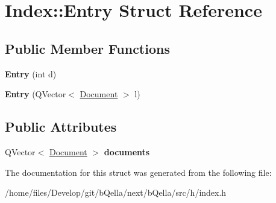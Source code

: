 \hypertarget{structIndex_1_1Entry}{
\section{Index::Entry Struct Reference}
\label{structIndex_1_1Entry}
}
\subsection*{Public Member Functions}
\begin{DoxyCompactItemize}
\item 
\hypertarget{structIndex_1_1Entry_a4cac4b5e2d1006f1556ec58e7ff87903}{
{\bfseries Entry} (int d)}
\label{structIndex_1_1Entry_a4cac4b5e2d1006f1556ec58e7ff87903}

\item 
\hypertarget{structIndex_1_1Entry_af5af36ebb255df3c9f144a038d0d2b00}{
{\bfseries Entry} (QVector$<$ \hyperlink{structDocument}{Document} $>$ l)}
\label{structIndex_1_1Entry_af5af36ebb255df3c9f144a038d0d2b00}

\end{DoxyCompactItemize}
\subsection*{Public Attributes}
\begin{DoxyCompactItemize}
\item 
\hypertarget{structIndex_1_1Entry_adc96150e84c26ae668efedc954d255e7}{
QVector$<$ \hyperlink{structDocument}{Document} $>$ {\bfseries documents}}
\label{structIndex_1_1Entry_adc96150e84c26ae668efedc954d255e7}

\end{DoxyCompactItemize}


The documentation for this struct was generated from the following file:\begin{DoxyCompactItemize}
\item 
/home/files/Develop/git/bQella/next/bQella/src/h/index.h\end{DoxyCompactItemize}
